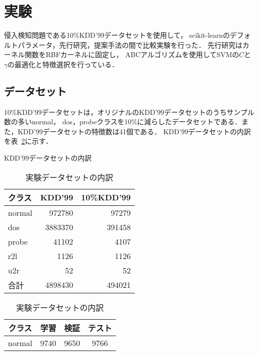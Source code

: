 \section{実験}
侵入検知問題である10\%KDD'99データセットを使用して，
scikit-learnのデフォルトパラメータ，先行研究，提案手法の間で比較実験を行った．
先行研究はカーネル関数をRBFカーネルに固定し，
ABCアルゴリズムを使用してSVMの$C$と$\gamma$の最適化と特徴選択を行っている\cite{origin}．
\subsection{データセット}
10\%KDD'99データセットは，オリジナルのKDD'99データセットのうちサンプル数の多いnormal，
dos，probeクラスを10\%に減らしたデータセットである．また，KDD'99データセットの特徴数は41個である．
KDD'99データセットの内訳を表~\ref{kdd99}に示す．
\begin{table}[tb]
    \centering
    \begin{minipage}{0.45\textwidth}  %
        \centering
        \caption{KDD'99データセットの内訳}  %
        \begin{tabular}{|l|r|r|}  %
          \hline  %
          クラス & KDD'99 & 10\%KDD'99 \\  %
          \hline  %
          normal & 972780 & 97279 \\  %
          \hline  %
          dos & 3883370 & 391458 \\  %
          \hline  %
          probe & 41102 & 4107 \\  %
          \hline  %
          r2l & 1126 & 1126 \\  %
          \hline  %
          u2r & 52 & 52 \\  %
          \hline  %
          合計 & 4898430 & 494021 \\  %
          \hline  %
        \end{tabular}
        \label{kdd99}  %
    \end{minipage}
    \begin{minipage}{0.45\textwidth}  %
        \centering
        \caption{実験データセットの内訳}  %
        \begin{tabular}{|c|c|c|c|}  %
          \hline  %
          クラス & 学習 & 検証 & テスト \\  %
          \hline  %
          normal & 9740 & 9650 & 9766 \\  %

\end{tabular}
\end{minipage}
\end{table}
